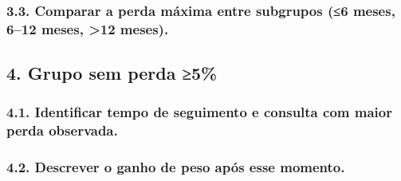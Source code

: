 \documentclass[
]{article}
\begin{document}
\subsubsection{3.3. Comparar a perda máxima entre subgrupos (≤6 meses,
6--12 meses, \textgreater12
meses).}\label{comparar-a-perda-muxe1xima-entre-subgrupos-6-meses-612-meses-12-meses.}

\subsection{4. Grupo sem perda ≥5\%}\label{grupo-sem-perda-5}

\subsubsection{4.1. Identificar tempo de seguimento e consulta com maior
perda
observada.}\label{identificar-tempo-de-seguimento-e-consulta-com-maior-perda-observada.}

\subsubsection{4.2. Descrever o ganho de peso após esse
momento.}\label{descrever-o-ganho-de-peso-apuxf3s-esse-momento.}
\end{document}
